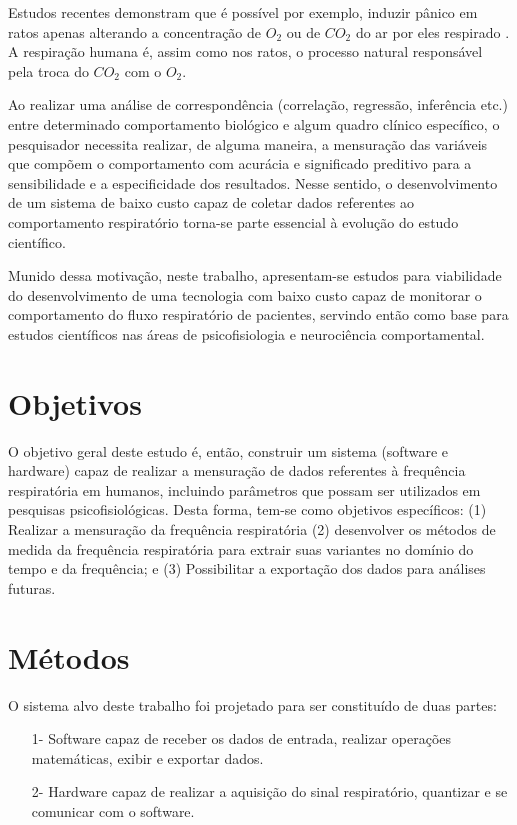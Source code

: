 		Estudos recentes demonstram que é possível por exemplo, induzir pânico em ratos apenas alterando a concentração de $O_2$ ou de $CO_2$ do ar por eles respirado \cite{spiacci2015serotonin} \cite{spiacci2018panic}. A respiração humana é, assim como nos ratos, o processo natural responsável pela troca do $CO_2$ com o $O_2$.    
		
		Ao realizar uma análise de correspondência (correlação, regressão, inferência etc.) entre determinado comportamento biológico e algum quadro clínico específico, o 		pesquisador necessita realizar, de alguma maneira, a mensuração das variáveis que compõem o comportamento com acurácia e significado preditivo para a sensibilidade e a especificidade dos resultados. Nesse sentido, o desenvolvimento de um sistema de baixo custo capaz de coletar dados referentes ao comportamento respiratório torna-se parte essencial à evolução do estudo científico. 
		  
		Munido dessa motivação, neste trabalho, apresentam-se estudos para viabilidade do desenvolvimento de uma tecnologia com baixo custo capaz de monitorar o comportamento do fluxo respiratório de pacientes, servindo então como base para estudos científicos nas áreas de psicofisiologia e neurociência comportamental. 
		
	\section{Objetivos}
	
		O objetivo geral deste estudo é, então, construir um sistema (software e hardware) capaz de realizar a mensuração de dados referentes à frequência respiratória em humanos, incluindo parâmetros que possam ser utilizados em pesquisas psicofisiológicas. Desta forma, tem-se como objetivos específicos: (1) Realizar a mensuração da frequência respiratória (2) desenvolver os métodos de medida da frequência respiratória para extrair suas variantes no domínio do tempo e da frequência; e (3) Possibilitar a exportação dos dados para análises futuras.

	\section{Métodos}
	
		O sistema alvo deste trabalho foi projetado para ser constituído de duas partes:
		
		\begin{itemize}
			\item [1-] Software capaz de receber os dados de entrada, realizar operações matemáticas, exibir e exportar dados.
			\item [2-] Hardware capaz de realizar a aquisição do sinal respiratório, quantizar e se comunicar com o software.
		\end{itemize}
		
